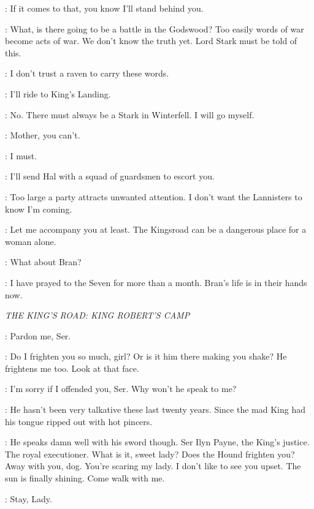 \THEON: If it comes to that, you know I'll stand behind you. 

\LUWIN: What, is there going to be a battle in the Godswood? Too easily words of war become acts of war. We don't know the truth yet. Lord Stark must be told of this. 

\CATELYN: I don't trust a raven to carry these words. 

\ROBB: I'll ride to King's Landing. 

\CATELYN: No. There must always be a Stark in Winterfell. I will go myself. 

\ROBB: Mother, you can't. 

\CATELYN: I must. 

\RODRIK: I'll send Hal with a squad of guardsmen to escort you. 

\CATELYN: Too large a party attracts unwanted attention. I don't want the Lannisters to know I'm coming. 

\RODRIK: Let me accompany you at least. The Kingsroad can be a dangerous place for a woman alone. 

\ROBB: What about Bran? 

\CATELYN: I have prayed to the Seven for more than a month. Bran's life is in their hands now. 


\scene

\textit{THE KING'S ROAD: KING ROBERT'S CAMP} 


\SANSA: Pardon me, Ser. 


\HOUND: Do I frighten you so much, girl? Or is it him there making you shake? He frightens me too. Look at that face. 

\SANSA:  I'm sorry if I offended you, Ser.  Why won't he speak to me? 

\HOUND: He hasn't been very talkative these last twenty years. Since the mad King had his tongue ripped out with hot pincers. 

\JOFFREY: He speaks damn well with his sword though. Ser Ilyn Payne, the King's justice. The royal executioner. What is it, sweet lady? Does the Hound frighten you? Away with you, dog. You're scaring my lady. I don't like to see you upset. The sun is finally shining. Come walk with me. 

\SANSA:  Stay, Lady. 

